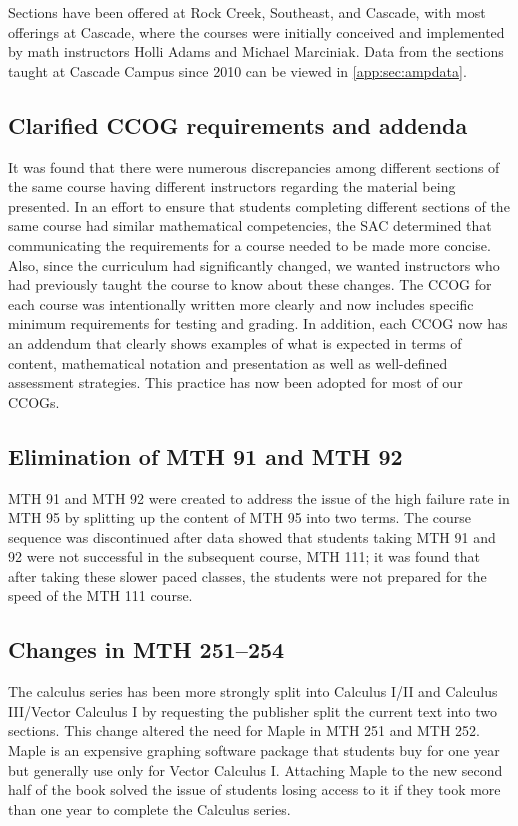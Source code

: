 Sections have been offered at Rock Creek, Southeast, and Cascade, with most offerings at Cascade, where the courses were initially conceived and implemented by math instructors Holli Adams and  Michael Marciniak.
Data from the sections taught at Cascade Campus since 2010 can be viewed in \vref{app:sec:ampdata}.

\subsection{Clarified CCOG requirements and addenda}
It was found that there were numerous discrepancies among different sections of the same course having different instructors regarding the material being presented.
In an effort to ensure that students completing different sections of the same course had similar mathematical competencies, the SAC determined that communicating the requirements for a course needed to be made more concise.
Also, since the curriculum had significantly changed, we wanted instructors who had previously taught the course to know about these changes.
The CCOG for each course was intentionally written more clearly and now includes specific minimum requirements for testing and grading.
In addition, each CCOG now has an addendum that clearly shows examples of what is expected in terms of content, mathematical notation and presentation as well as well-defined assessment strategies.
This practice has now been adopted for most of our CCOGs.

\subsection{Elimination of MTH 91 and MTH 92}
MTH 91 and MTH 92 were created to address the issue of the high failure rate in MTH 95 by splitting up the content of MTH 95 into two terms.
The course sequence was discontinued after data showed that students taking MTH 91 and 92 were not successful in the subsequent course, MTH 111; it was found that after taking these slower paced classes, the students were not prepared for the speed of the MTH 111 course.

\subsection{Changes in MTH 251--254}
The calculus series has been more strongly split into Calculus I/II and Calculus III/Vector Calculus I by requesting the publisher split the current text into two sections.
This change altered the need for Maple in MTH 251 and MTH 252.
Maple is an expensive graphing software package that students buy for one year but generally use only for Vector Calculus I.
Attaching Maple to the new second half of the book solved the issue of students losing access to it if they took more than one year to complete the Calculus series.

